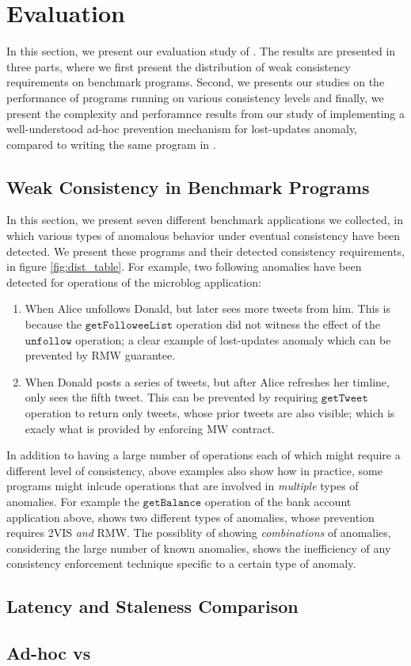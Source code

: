 \newpage
\section{Evaluation}
\label{sec:eval}
In this section, we present our evaluation study of \tool. The results
are presented in three parts, where we first present the distribution of
weak consistency requirements on benchmark programs. Second, we presents
our studies on the performance of programs running on various
consistency levels and finally, we present the complexity and
perforamnce results from our study of implementing 
a well-understood 
ad-hoc prevention mechanism for lost-updates anomaly, compared to writing
the same program in \tool. 
%
%
% 
\subsection{Weak Consistency in Benchmark Programs}

In this section, we present seven different benchmark applications we collected,
in which various types of anomalous behavior under eventual consistency have been
detected. We present these programs and their detected consistency
requirements, in figure \ref{fig:dist_table}. 
For example, two following anomalies have been detected for operations
of the microblog application:
\begin{enumerate}
  \item When Alice unfollows Donald, but later
  sees more tweets from him. This is because the
  $\mathtt{getFolloweeList}$ operation did not witness the effect of the
  $\mathtt{unfollow}$
  operation; a clear example of lost-updates anomaly which can be
  prevented by RMW guarantee.
  \item When Donald posts a series of tweets, but after Alice refreshes
  her timline, only sees the fifth tweet. This can be prevented by
  requiring $\mathtt{getTweet}$ operation to return only tweets, whose prior
  tweets are also visible; which is exacly what is provided by
  enforcing MW contract.
\end{enumerate}

In addition to having a large number of operations each of which might
require a different level of consistency, above examples also show how
in practice, some programs might inlcude
operations that are involved in \emph{multiple} types of anomalies. For example
the $\mathtt{getBalance}$ operation of the bank account application above,
shows two different types of anomalies, whose prevention requires 2VIS
\emph{and} RMW. The possiblity of showing \emph{combinations} of
anomalies, considering the large number of known anomalies, shows the
inefficiency of any consistency enforcement technique specific to a
certain type of anomaly.
%
%
%
\subsection{Latency and Staleness Comparison}




















\newpage
\subsection{Ad-hoc vs \tool }
\newpage
